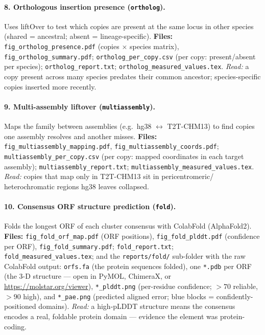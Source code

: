 \documentclass[11pt]{article}
\begin{document}
\paragraph{8. Orthologous insertion presence (\texttt{ortholog}).}
Uses liftOver to test which copies are present at the same locus in other
species (shared = ancestral; absent = lineage-specific).
\textbf{Files:} \texttt{fig\_ortholog\_presence.pdf} (copies $\times$
species matrix), \texttt{fig\_ortholog\_summary.pdf};
\texttt{ortholog\_per\_copy.csv} (per copy: present/absent per species);
\texttt{ortholog\_report.txt}; \texttt{ortholog\_measured\_values.tex}.
\emph{Read:} a copy present across many species predates their common
ancestor; species-specific copies inserted more recently.

\paragraph{9. Multi-assembly liftover (\texttt{multiassembly}).}
Maps the family between assemblies (e.g.\ hg38 $\leftrightarrow$ T2T-CHM13)
to find copies one assembly resolves and another misses.
\textbf{Files:} \texttt{fig\_multiassembly\_mapping.pdf},
\texttt{fig\_multiassembly\_coords.pdf};
\texttt{multiassembly\_per\_copy.csv} (per copy: mapped coordinates in each
target assembly); \texttt{multiassembly\_report.txt};
\texttt{multiassembly\_measured\_values.tex}.
\emph{Read:} copies that map only in T2T-CHM13 sit in pericentromeric/
heterochromatic regions hg38 leaves collapsed.

\paragraph{10. Consensus ORF structure prediction (\texttt{fold}).}
Folds the longest ORF of each cluster consensus with ColabFold (AlphaFold2).
\textbf{Files:} \texttt{fig\_fold\_orf\_map.pdf} (ORF positions),
\texttt{fig\_fold\_plddt.pdf} (confidence per ORF),
\texttt{fig\_fold\_summary.pdf}; \texttt{fold\_report.txt};
\texttt{fold\_measured\_values.tex}; and the \texttt{reports/fold/}
sub-folder with the raw ColabFold output: \texttt{orfs.fa} (the protein
sequences folded), one \texttt{*.pdb} per ORF (the 3-D structure --- open
in PyMOL, ChimeraX, or \url{https://molstar.org/viewer}),
\texttt{*\_plddt.png} (per-residue confidence; $>70$ reliable, $>90$
high), and \texttt{*\_pae.png} (predicted aligned error; blue blocks =
confidently-positioned domains).
\emph{Read:} a high-pLDDT structure means the consensus encodes a real,
foldable protein domain --- evidence the element was protein-coding.
\end{document}
